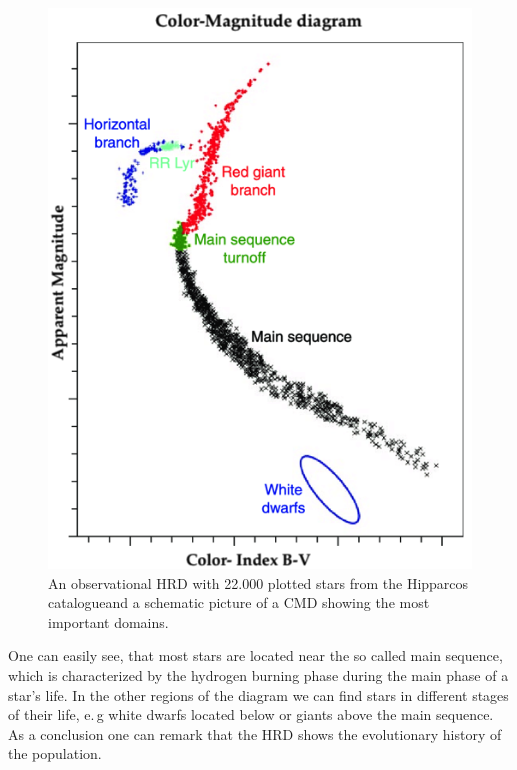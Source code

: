 \begin{figure}[H]
\begin{minipage}{0.4 \textwidth}
		\includegraphics[scale=0.3]{figures/Introduction/cmd2}
	\end{minipage}
	
\caption[Hertzsprung-Russell diagram]{An observational HRD with 22.000 plotted stars from the Hipparcos catalogue\footnotemark and a schematic picture of a CMD showing the most important domains.\footnotemark}
\end{figure}
One can easily see, that most stars are located near the so called main sequence, which is characterized by the hydrogen burning phase during the main phase of a star's life. In the other regions of the diagram we can find stars in different stages of their life, e.\,g  white dwarfs located below or giants above the main sequence. \\
As a conclusion one can remark that the HRD shows the evolutionary history of the population. \\
